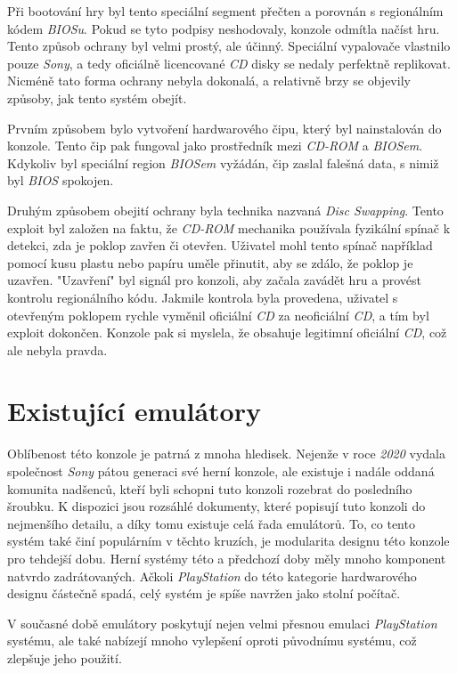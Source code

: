 Při bootování hry byl tento speciální segment přečten a porovnán s regionálním kódem \textit{BIOSu}. 
Pokud se tyto podpisy neshodovaly, konzole odmítla načíst hru.
Tento způsob ochrany byl velmi prostý, ale účinný. Speciální vypalovače vlastnilo pouze \textit{Sony}, 
a tedy oficiálně licencované \textit{CD} disky se nedaly perfektně replikovat. 
Nicméně tato forma ochrany nebyla dokonalá, a relativně brzy se objevily způsoby, jak tento systém obejít.

Prvním způsobem bylo vytvoření hardwarového čipu, který byl nainstalován do konzole. 
Tento čip pak fungoval jako prostředník mezi \textit{CD-ROM} a \textit{BIOSem}. 
Kdykoliv byl speciální region \textit{BIOSem} vyžádán, čip zaslal falešná data, s nimiž byl \textit{BIOS} spokojen.

Druhým způsobem obejití ochrany byla technika nazvaná \textit{Disc Swapping}.
Tento exploit byl založen na faktu, že \textit{CD-ROM} mechanika používala fyzikální spínač k detekci, 
zda je poklop zavřen či otevřen. Uživatel mohl tento spínač například pomocí kusu plastu nebo papíru 
uměle přinutit, aby se zdálo, že poklop je uzavřen. "Uzavření" byl signál pro konzoli, aby začala 
zavádět hru a provést kontrolu regionálního kódu. Jakmile kontrola byla provedena, uživatel s otevřeným 
poklopem rychle vyměnil oficiální \textit{CD} za neoficiální \textit{CD}, a tím byl exploit dokončen. 
Konzole pak si myslela, že obsahuje legitimní oficiální \textit{CD}, což ale nebyla pravda.

\section{Existující emulátory}

Oblíbenost této konzole je patrná z mnoha hledisek. 
Nejenže v roce \textit{2020} vydala společnost \textit{Sony} pátou generaci své herní konzole, 
ale existuje i nadále oddaná komunita nadšenců, kteří byli schopni tuto konzoli rozebrat do 
posledního šroubku. K dispozici jsou rozsáhlé dokumenty, které popisují tuto konzoli do 
nejmenšího detailu, a díky tomu existuje celá řada emulátorů. 
To, co tento systém také činí populárním v těchto kruzích, je modularita designu této konzole 
pro tehdejší dobu. Herní systémy této a předchozí doby měly mnoho komponent natvrdo zadrátovaných. 
Ačkoli \textit{PlayStation} do této kategorie hardwarového designu částečně spadá, celý systém je spíše navržen jako stolní počítač.

V současné době emulátory poskytují nejen velmi přesnou emulaci \textit{PlayStation} systému, ale 
také nabízejí mnoho vylepšení oproti původnímu systému, což zlepšuje jeho použití.

